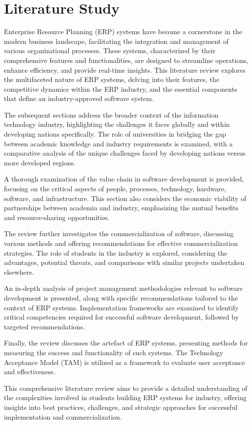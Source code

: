 \chapter{Literature Study}
\par{Enterprise Resource Planning (ERP) systems have become a cornerstone in the modern business 
landscape, facilitating the integration and management of various organizational processes. 
These systems, characterized by their comprehensive features and functionalities, are designed 
to streamline operations, enhance efficiency, and provide real-time insights. This literature 
review explores the multifaceted nature of ERP systems, delving into their features, the 
competitive dynamics within the ERP industry, and the essential components that define an 
industry-approved software system.}
\par{The subsequent sections address the broader context of the information technology industry, 
highlighting the challenges it faces globally and within developing nations specifically. The role 
of universities in bridging the gap between academic knowledge and industry requirements is 
examined, with a comparative analysis of the unique challenges faced by developing nations versus 
more developed regions.}
\par{A thorough examination of the value chain in software development is provided, focusing on 
the critical aspects of people, processes, technology, hardware, software, and infrastructure. 
This section also considers the economic viability of partnerships between academia and industry, 
emphasizing the mutual benefits and resource-sharing opportunities.}
\par{The review further investigates the commercialization of software, discussing various methods 
and offering recommendations for effective commercialization strategies. The role of students in the
industry is explored, considering the advantages, potential threats, and comparisons with similar 
projects undertaken elsewhere.}
\par{An in-depth analysis of project management methodologies relevant to software development 
is presented, along with specific recommendations tailored to the context of ERP systems. 
Implementation frameworks are examined to identify critical competencies required for successful 
software development, followed by targeted recommendations.}
\par{Finally, the review discusses the artefact of ERP systems, presenting methods for
measuring the success and functionality of such systems. The Technology Acceptance Model (TAM)
is utilized as a framework to evaluate user acceptance and effectiveness.}
\par{This comprehensive literature review aims to provide a detailed understanding of the 
complexities involved in students building ERP systems for industry, offering insights into best 
practices, challenges, and strategic approaches for successful implementation and commercialization.}
